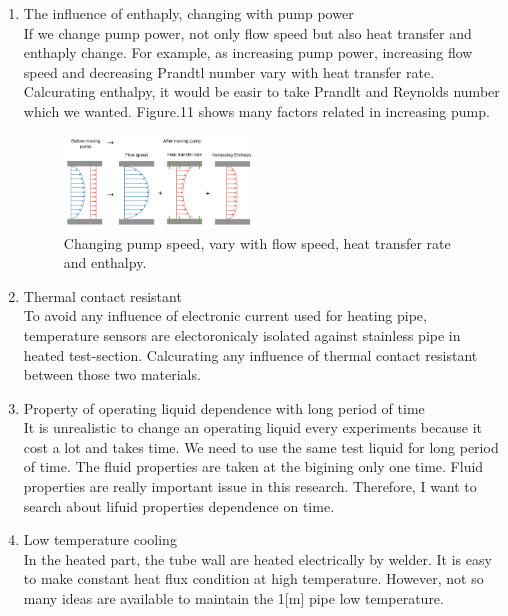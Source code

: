 \documentclass[conference]{IEEEtran}
\begin{document}
\begin{enumerate}
  \item The influence of enthaply, changing with pump power\\
  If we change pump power, not only flow speed but also heat transfer and enthaply change.
  For example, as increasing pump power, increasing flow speed and decreasing Prandtl number vary with heat transfer rate.
  Calcurating enthalpy, it would be easir to take Prandlt and Reynolds number which we wanted.
  Figure.11 shows many factors related in increasing pump.
\begin{figure}[htbp]
\vspace{3zh}
  \centering
  \includegraphics[width=0.47\textwidth,natwidth=750,natheight=300]{fig/pump_enthalpy.png}
  \caption{Changing pump speed, vary with flow speed, heat transfer rate and enthalpy.}
  \label{pump_enthalpy}
  \vspace{0zh}
\end{figure}
\newpage  
  \item Thermal contact resistant\\
  To avoid any influence of electronic current used for heating pipe, temperature sensors are electoronicaly isolated against stainless pipe in heated test-section.
  Calcurating any influence of thermal contact resistant between those two materials.\\
  \item Property of operating liquid dependence with long period of time\\
  It is unrealistic to change an operating liquid every experiments because it cost a lot and takes time.
  We need to use the same test liquid for long period of time.
  The fluid properties are taken at the bigining only one time.
  Fluid properties are really important issue in this research.
  Therefore, I want to search about lifuid properties dependence on time.\\
  \item Low temperature cooling\\
  In the heated part, the tube wall are heated electrically by welder.
  It is easy to make constant heat flux condition at high temperature.
  However, not so many ideas are available to maintain the 1[m] pipe low temperature.\\

\end{enumerate}
\end{document}

